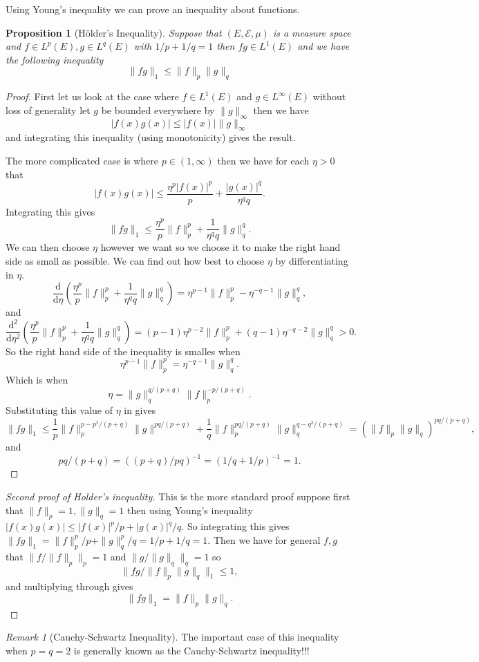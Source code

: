 \documentclass[11pt]{article}
\newtheorem{prp}[thm]{Proposition}
\theoremstyle{definition}
\theoremstyle{remark}
\newtheorem{remark}[thm]{Remark}
\begin{document}
Using Young's inequality we can prove an inequality about functions.

\begin{prp}[H\"older's Inequality]
Suppose that $(E, \mathcal{E}, \mu)$ is a measure space and $f \in L^p(E), g \in L^q(E)$ with $1/p+1/q =1$ then $fg \in L^1(E)$ and we have the following inequality
\[ \|fg\|_1 \leq  \|f\|_p \|g\|_q \]
\end{prp}
\begin{proof}
First let us look at the case where $f \in L^1(E)$ and $g \in L^\infty(E)$ without loss of generality let $g$ be bounded everywhere by $\|g\|_\infty$ then we have
\[ |f(x)g(x)| \leq |f(x)| \|g\|_\infty \] and integrating this inequality (using monotonicity) gives the result.

The more complicated case is where $p \in (1, \infty)$  then we have for each $\eta >0$ that
\[ |f(x)g(x)| \leq \frac{\eta^p |f(x)|^p}{p} + \frac{|g(x)|^q}{\eta^q q}. \] Integrating this gives
\[ \|fg\|_1 \leq \frac{\eta^p}{p} \|f\|_p^p + \frac{1}{\eta^q q} \|g\|_q^q. \] We can then choose $\eta$ however we want so we choose it to make the right hand side as small as possible. We can find out how best to choose $\eta$ by differentiating in $\eta$.
\[ \frac{\mathrm{d}}{\mathrm{d}\eta} \left(\frac{\eta^p}{p} \|f\|_p^p + \frac{1}{\eta^q q} \|g\|_q^q\right) = \eta^{p-1} \|f\|_p^p - \eta^{-q-1} \|g\|_q^q, \] and
\[ \frac{\mathrm{d}^2}{\mathrm{d}\eta^2} \left(\frac{\eta^p}{p} \|f\|_p^p + \frac{1}{\eta^q q} \|g\|_q^q\right) = (p-1) \eta^{p-2} \|f\|_p^p + (q-1) \eta^{-q-2} \|g\|_q^q>0.\] So the right hand side of the inequality is smalles when
\[\eta^{p-1} \|f\|_p^p = \eta^{-q-1} \|g\|_q^q.  \] Which is when
\[ \eta = \|g\|_q^{q/(p+q)} \|f\|_p^{-p/(p+q)}. \] Substituting this value of $\eta$ in gives
\[ \|fg\|_1 \leq \frac{1}{p} \|f\|_p^{p-p^2/(p+q)} \|g\|^{pq/(p+q)} + \frac{1}{q} \|f\|^{pq/(p+q)}_p \|g\|_q^{q-q^2/(p+q)} = \left(\|f\|_p \|g\|_q \right)^{pq/(p+q)},\] and
\[ pq/(p+q) = \left( (p+q)/pq \right)^{-1} = \left( 1/q + 1/p \right)^{-1} = 1. \]
\end{proof}
\begin{proof}[Second proof of Holder's inequality]
This is the more standard proof suppose first that $\|f\|_p =1, \|g\|_q = 1$ then using Young's inequality $|f(x)g(x)| \leq |f(x)|^p/p + |g(x)|^q/q$. So integrating this gives $\|fg\|_1 = \|f\|^p_p/p + \|g\|^p_q/q = 1/p + 1/q = 1$. Then we have for general $f,g$ that $\|f/\|f\|_p\|_p = 1$ and $\|g/\|g\|_q\|_q = 1$ so
\[ \| fg/ \|f\|_p \|g\|_q\|_1 \leq 1,  \] and multiplying through gives
\[ \|fg\|_1 = \|f\|_p \|g\|_q.\]
\end{proof}
\begin{remark}[Cauchy-Schwartz Inequality]
The important case of this inequality when $p=q=2$ is generally known as the Cauchy-Schwartz inequality!!!
\end{remark}
\end{document}
